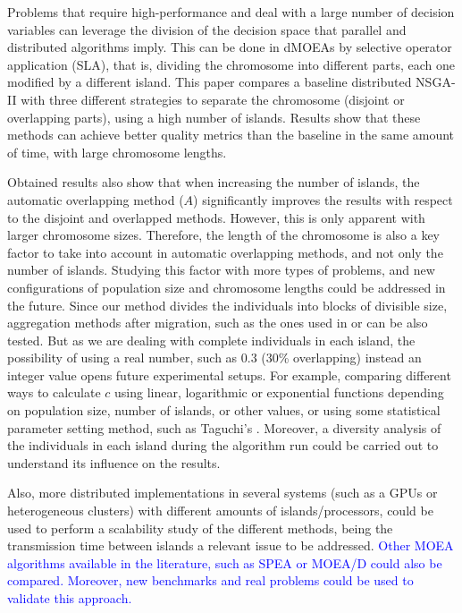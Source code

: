 \documentclass[preprint]{elsarticle}
\begin{document}
Problems that require high-performance 
 and deal with a large number of decision variables can leverage the
 division of the decision space that parallel and distributed
 algorithms imply. This can be done in dMOEAs by selective operator application (SLA), that is, dividing the
 chromosome into different parts, each one modified by a different
 island. This paper compares a baseline distributed NSGA-II with three
 different strategies to separate the chromosome (disjoint or
 overlapping parts), using a high number of islands. Results show that
 these methods can achieve better quality metrics than the baseline in
 the same amount of time, with large chromosome lengths. 

Obtained results also show that when increasing the number of islands, the
automatic overlapping method ($A$) significantly improves the results with
respect to the disjoint and overlapped methods. However, this is only
apparent with larger chromosome sizes. Therefore, the length of the
chromosome is also a key factor to take into account in automatic overlapping
methods, and not only the number of islands. Studying this factor with
more types of problems, and new configurations of population size and
chromosome lengths could be addressed in the future. Since our method divides the individuals into blocks of divisible size, aggregation methods after migration, such as the ones used in \cite{Kimovski15Parallel} or \cite{Dorronsoro13superlinear} can be also tested. But as we are dealing with complete individuals in each island, the possibility of using a real number, such as 0.3 (30\% overlapping) instead an integer value opens future experimental setups.
For example, comparing 
different ways to calculate $c$ using linear, logarithmic or exponential functions
depending on population size, number of islands, or other values, or using some statistical parameter setting method, such as Taguchi's \cite{Keratmatpour2018Taguchi}. Moreover, a diversity analysis of the individuals
in each island during the algorithm run could be carried out to understand its influence
on the results.

% 

Also, more distributed implementations in several systems (such as a
GPUs or heterogeneous clusters) with different amounts of
islands/processors, could be used to perform a scalability study of the
different methods, being the transmission time between islands a
relevant issue to be addressed. \textcolor{blue}{Other MOEA algorithms available in the literature, such as SPEA or MOEA/D could also be compared. Moreover, new benchmarks and real problems
could be  used to validate this approach.}
\end{document}
